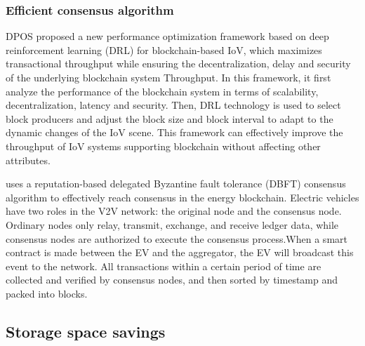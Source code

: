 \subsubsection{Efficient consensus algorithm}
\cite{ref42} DPOS
\cite{ref31} proposed a new performance optimization framework based on deep reinforcement learning (DRL) for blockchain-based IoV, which maximizes transactional throughput while ensuring the decentralization, delay and security of the underlying blockchain system Throughput. In this framework, it first analyze the performance of the blockchain system in terms of scalability, decentralization, latency and security. Then, DRL technology is used to select block producers and adjust the block size and block interval to adapt to the dynamic changes of the IoV scene. This framework can effectively improve the throughput of IoV systems supporting blockchain without affecting other attributes.

\cite{ref81} uses a reputation-based delegated Byzantine fault tolerance (DBFT) consensus algorithm to effectively reach consensus in the energy blockchain. Electric vehicles have two roles in the V2V network: the original node and the consensus node. Ordinary nodes only relay, transmit, exchange, and receive ledger data, while consensus nodes are authorized to execute the consensus process.When a smart contract is made between the EV and the aggregator, the EV will broadcast this event to the network. All transactions within a certain period of time are collected and verified by consensus nodes, and then sorted by timestamp and packed into blocks.

\subsection{Storage space savings}

